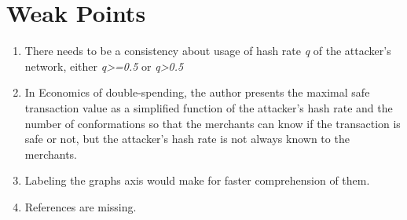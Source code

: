 \documentclass[conference]{IEEEtran}
\begin{document}
\section{Weak Points}
\begin{enumerate}
\item There needs to be a consistency about usage of hash rate \emph{q} of the attacker's network, either \emph{q\textgreater=0.5} or \emph{q\textgreater 0.5}
\item In Economics of double-spending, the author presents the maximal safe transaction value as a simplified function of the attacker's hash rate and the number of conformations so that the merchants can know if the transaction is safe or not, but the attacker's hash rate is not always known to  the merchants.
\item Labeling the graphs axis would make for faster comprehension of them.
\item References are missing.
\end{enumerate}





%




\end{document}
